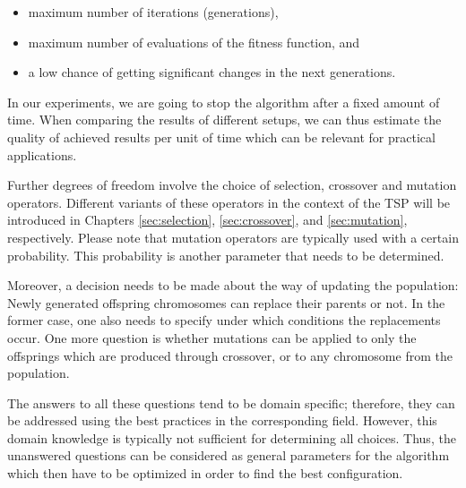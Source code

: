  \begin{itemize}
	\item maximum number of iterations (generations),
	\item maximum number of evaluations of the fitness function, and
	\item a low chance of getting significant changes in the next generations.
\end{itemize}

In our experiments, we are going to stop the algorithm after a fixed amount of time. When comparing the results of different setups, we can thus estimate the quality of achieved results per unit of time which can be relevant for practical applications. \par

Further degrees of freedom involve the choice of selection, crossover and mutation operators. Different variants of these operators in the context of the TSP will be introduced in Chapters \ref{sec:selection}, \ref{sec:crossover}, and \ref{sec:mutation}, respectively. Please note that mutation operators are typically used with a certain probability. This probability is another parameter that needs to be determined.\par

Moreover, a decision needs to be made about the way of updating the population: Newly generated offspring chromosomes can replace their parents or not. In the former case, one also needs to specify under which conditions the replacements occur. One more question is whether mutations can be applied to only the offsprings which are produced through crossover, or to any chromosome from the population.\par

The answers to all these questions tend to be domain specific; therefore, they can be addressed using the best practices in the corresponding field. However, this domain knowledge is typically not sufficient for determining all choices. Thus, the unanswered questions can be considered as general parameters for the algorithm which then have to be optimized in order to find the best configuration.\\


